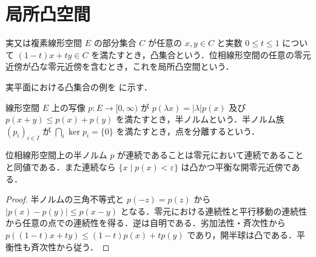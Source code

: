 \section{局所凸空間}
\begin{defn}[凸集合と局所凸空間]
実又は複素線形空間 $E$ の部分集合 $C$ が任意の $x,y\in C$ と実数 $0\leq t\leq1$ について $(1-t)x+ty\in C$ を満たすとき，凸集合という．位相線形空間の任意の零元近傍が凸な零元近傍を含むとき，これを局所凸空間という．
\end{defn}
実平面における凸集合の例を  に示す．
\begin{defn}[半ノルム]
線形空間 $E$ 上の写像 $p:E\to[0,\infty)$ が $p(\lambda x)=|\lambda|p(x)$ 及び $p(x+y)\leq p(x)+p(y)$ を満たすとき，半ノルムという．半ノルム族 $(p_i)_{i\in I}$ が $\bigcap_i\ker p_i=\{0\}$ を満たすとき，点を分離するという．
\end{defn}
\begin{prop}[半ノルムの連続性判定]
位相線形空間上の半ノルム $p$ が連続であることは零元において連続であることと同値である．また連続なら $\{x\mid p(x)<\varepsilon\}$ は凸かつ平衡な開零元近傍である．
\end{prop}
\begin{proof}
半ノルムの三角不等式と $p(-z)=p(z)$ から $|p(x)-p(y)|\leq p(x-y)$ となる．零元における連続性と平行移動の連続性から任意の点での連続性を得る．逆は自明である．劣加法性・斉次性から $p((1-t)x+ty)\leq(1-t)p(x)+tp(y)$ であり，開半球は凸である．平衡性も斉次性から従う．
\end{proof}
